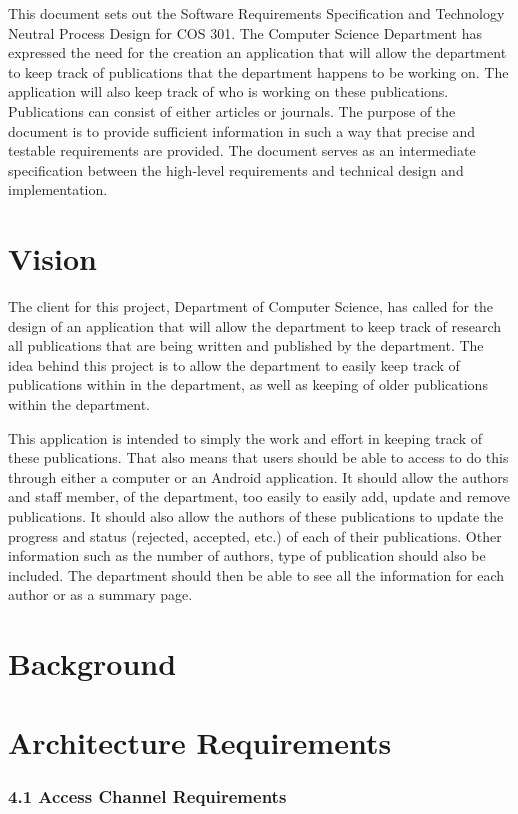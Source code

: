 \documentclass[a4paper,12pt]{report}
\begin{document}
This document sets out the Software Requirements Specification and Technology Neutral Process Design for COS 301. The Computer Science Department has expressed the need for the creation an application that will allow the department to keep track of publications that the department happens to be working on. The application will also keep track of who is working on these publications. Publications can consist of either articles or journals. The purpose of the document is to provide sufficient information in such a way that precise and testable requirements are provided. The document serves as an intermediate specification between the high-level requirements and technical design and implementation. 

\newpage
\section{Vision}

The client for this project, Department of Computer Science, has called for the design of an application that will allow the department to keep track of research all publications that are being written and published by the department.  The idea behind this project is to allow the department to easily keep track of publications within in the department, as well as keeping of older publications within the department.

This application is intended to simply the work and effort in keeping track of these publications. That also means that users should be able to access to do this through either a computer or an Android application. It should allow the authors and staff member, of the department, too easily to easily add, update and remove publications. It should also allow the authors of these publications to update the progress and status (rejected, accepted, etc.) of each of their publications. Other information such as the number of authors, type of publication should also be included. The department should then be able to see all the information for each author or as a summary page.

\newpage
\section{Background}

\newpage
\section{Architecture Requirements}
\subsubsection{4.1 Access Channel Requirements}
\end{document}
